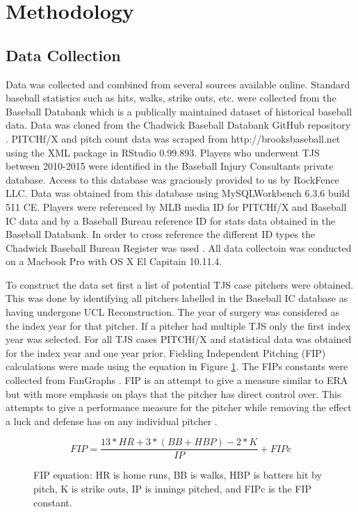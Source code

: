 \section{Methodology}

\subsection{Data Collection}

Data was collected and combined from several sources available online. Standard baseball statistics such as hits, walks, strike outs, etc. were collected from the Baseball Databank which is a publically maintained dataset of historical baseball data. Data was cloned from the Chadwick Baseball Databank GitHub repository \cite{ChadwickBD}. PITCHf/X and pitch count data was scraped from http://brooksbaseball.net using the XML package in RStudio 0.99.893. Players who underwent TJS between 2010-2015 were identified in the Baseball Injury Consultants private database. Access to this database was graciously provided to us by RockFence LLC. Data was obtained from this database using MySQLWorkbench 6.3.6 build 511 CE. Players were referenced by MLB media ID for PITCHf/X and Baseball IC data and by a Baseball Bureau reference ID for stats data obtained in the Baseball Databank. In order to cross reference the different ID types the Chadwick Baseball Bureau Register was used \cite{ChadwickR}. All data collectoin was conducted on a Macbook Pro with OS X El Capitain 10.11.4.

To construct the data set first a list of potential TJS case pitchers were obtained. This was done by identifying all pitchers labelled in the Baseball IC database as having undergone UCL Reconstruction. The year of surgery was considered as the index year for that pitcher. If a pitcher had multiple TJS only the first index year was selected. For all TJS cases PITCHf/X and statistical data was obtained for the index year and one year prior. Fielding Independent Pitching (FIP) calculations were made using the equation in Figure \ref{eq:fip}. The FIPs constants were collected from FanGraphs \cite{Fangraphs}. FIP is an attempt to give a measure similar to ERA but with more emphasis on plays that the pitcher has direct control over. This attempts to give a performance measure for the pitcher while removing the effect a luck and defense has on any individual pitcher \cite{FangraphsFIP}.

\begin{figure}[hb]
    \centering
        \[ FIP = \frac{13 * HR + 3 * (BB + HBP) - 2 * K}{IP} + FIPc\]
    \caption{FIP equation: HR is home runs, BB is walks, HBP is batters hit by pitch, K is strike outs, IP is innings pitched, and FIPc is the FIP constant. \cite{FangraphsFIP}}
    \label{eq:fip}
\end{figure}

